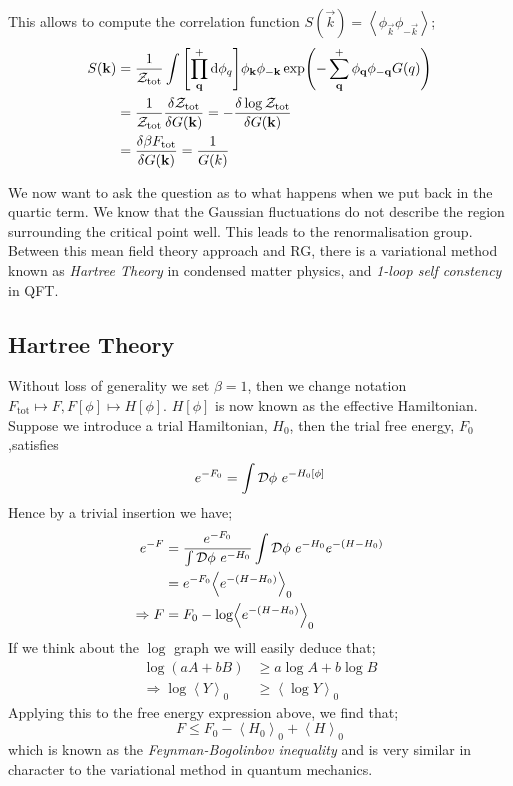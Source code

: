 \begin{examplebox}
This allows to compute the correlation function $S(\vec{k}) = \left< \phi_{\vec{k}} \phi_{-\vec{k}} \right>$;
\begin{align*}
S(\vec{k}) &= \frac{1}{\mZ_{\text{tot}}} \int{\left[\prod_{\vec{q}}^{+}{\ud \phi_{q}}\right]\phi_{\vec{k}}\phi_{-\vec{k}}\exp\left(-\sum_{\vec{q}}^{+}{\phi_{\vec{q}}\phi_{-\vec{q}}G(q)}\right)} \\
&= \frac{1}{\mZ_{\text{tot}}}\frac{\delta \mZ_{\text{tot}}}{\delta G(\vec{k})} = -\frac{\delta \log \mZ_{\text{tot}}}{\delta G(\vec{k})} \\
&= \frac{\delta \beta F_{\text{tot}}}{\delta G(\vec{k})} = \frac{1}{G(k)}
\end{align*}
\end{examplebox}
We now want to ask the question as to what happens when we put back in the quartic term. We know that the Gaussian fluctuations do not describe the region surrounding the critical point well. This leads to the renormalisation group. Between this mean field theory approach and RG, there is a variational method known as \emph{Hartree Theory} in condensed matter physics, and \emph{1-loop self constency} in QFT.
\subsection{Hartree Theory}\label{sec:hartree}
Without loss of generality we set $\beta = 1$, then we change notation $F_{\text{tot}} \mapsto F, F[\phi] \mapsto H[\phi]$. $H[\phi]$ is now known as the effective Hamiltonian. Suppose we introduce a trial Hamiltonian, $H_{0}$, then the trial free energy, $F_{0}$,satisfies
\begin{equation*}
e^{-F_{0}} = \int{\mathcal{D}\phi\,\,e^{-H_{0}[\phi]}}
\end{equation*}
Hence by a trivial insertion we have;
\begin{align*}
e^{-F} &= \frac{e^{-F_{0}}}{\int{\mD\phi\,\,e^{-H_{0}}}} \int{\mD\phi\,\,e^{-H_{0}}e^{-(H - H_0)}} \\
&= e^{-F_0} \left< e^{-(H - H_0)} \right>_0 \\
\Rightarrow F &= F_0 - \log\left< e^{-(H - H_0)} \right>_0
\end{align*}
If we think about the $\log$ graph we will easily deduce that;
\begin{align*}
\log(aA + bB) &\geq a\log A + b\log B \\
\Rightarrow \log\left< Y \right>_0 &\geq \left< \log Y \right>_0
\end{align*}
Applying this to the free energy expression above, we find that;
\begin{equation}
F \leq F_{0} - \left< H_0 \right>_0 + \left< H \right>_0
\end{equation}
which is known as the \emph{Feynman-Bogolinbov inequality} and is very similar in character to the variational method in quantum mechanics.
